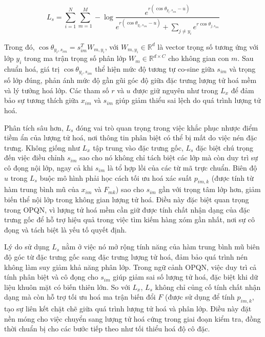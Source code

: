\begin{equation}
    L_s = \sum_{i=1}^N \sum_{m=1}^M - \log \frac{e^{r(\cos\theta_{y_i, s_{im}} - u)}}{e^{r(\cos\theta_{y_i, s_{im}} - u)} + \sum_{j \neq y_i} e^{r\cos\theta_{j, s_{im}}}}
\end{equation}

Trong đó, $\cos \theta_{y_i, s_{im}} = s^T_{im} W_{m,y_i}$, với $W_{m,y_i} \in \mathbb{R}^d$ là vector trọng số tương ứng với lớp $y_i$ trong ma trận trọng số phân lớp $W_m \in \mathbb{R}^{d \times C}$ cho không gian con $m$. Sau chuẩn hoá, giá trị $\cos \theta_{y_i, s_{im}}$ thể hiện mức độ tương tự co-sine giữa $s_{im}$ và trọng số lớp đúng, phản ánh  mức độ gần gũi góc độ giữa đặc trưng lượng tử hoá mềm và lý tưởng hoá lớp. Các tham số $r$ và $u$ được giữ nguyên như trong $L_x$ để đảm bảo sự tương thích giữa $x_{im}$ và $s_{im}$ giúp giảm thiểu sai lệch do quá trình lượng tử hoá.

Phân tích sâu hơn, $L_s$ đóng vai trò quan trọng trong việc khắc phục nhược điểm tiềm ẩn của lượng tử hoá, nơi thông tin phân biệt có thể bị mất do việc nén đặc trưng. Không giống như $L_x$ tập trung vào đặc trưng gốc, $L_s$ đặc biệt chú trọng đến việc điều chỉnh $s_{im}$ sao cho nó không chỉ tách biệt các lớp mà còn duy trì sự cô đọng nội lớp, ngay cả khi $s_{im}$ là tổ hợp lồi của các từ mã trực chuẩn. Biên độ $u$ trong $L_s$ buộc mô hình phải học cách tối ưu hoá xác suất $p_{im,k}$ (được tính từ hàm trung bình mũ của $x_{im}$ và $F_{mk}$) sao cho $s_{im}$ gần với trọng tâm lớp hơn, giảm biến thể nội lớp trong không gian lượng tử hoá. Điều này đặc biệt quan trọng trong OPQN, vì lượng tử hoá mềm cần giữ được tính chất nhận dạng của đặc trưng gốc để hỗ trợ hiệu quả trong việc tìm kiếm hàng xóm gần nhất, nơi sự cô đọng  và tách biệt là yếu tố quyết định.

Lý do sử dụng $L_s$ nằm ở việc nó mở rộng tính năng của hàm trung bình mũ biên độ góc từ đặc trưng gốc sang đặc trưng lượng tử hoá, đảm bảo quá trình nén không làm suy giảm khả năng phân lớp. Trong ngữ cảnh OPQN, việc duy trì cả tính phân biệt và cô đọng cho $s_{im}$ giúp giảm sai số lượng tử hoá, đặc biệt khi dữ liệu khuôn mặt có biến thiên lớn. So với $L_x$, $L_s$ không chỉ củng cố tính chất nhận dạng mà còn hỗ trợ tối ưu hoá ma trận biến đổi $F$ (được sử dụng để tính $p_{im,k}$, tạo sự liên kết chặt chẽ giữa quá trình lượng tử hoá và phân lớp. Điều này đặt nền móng cho việc chuyển sang lượng tử hoá cứng trong giai đoạn kiểm tra, đồng thời chuẩn bị cho các bước tiếp theo như tối thiểu hoá độ cô đặc.

